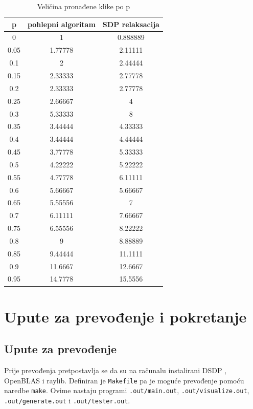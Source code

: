 \documentclass[diplomskirad]{fer}
\begin{document}
\begin{table}
  \caption{Veličina pronađene klike po p}
  \label{table:klik_p}
  \centering
  \begin{tabular}{|c|c|c|}
    \hline
    p & pohlepni algoritam & SDP relaksacija \\
    \hline
    \hline
    0 & 1 & 0.888889 \\
    \hline
    0.05 & 1.77778 & 2.11111 \\
    \hline
    0.1 & 2 & 2.44444 \\
    \hline
    0.15 & 2.33333 & 2.77778 \\
    \hline
    0.2 & 2.33333 & 2.77778 \\
    \hline
    0.25 & 2.66667 & 4 \\
    \hline
    0.3 & 5.33333 & 8 \\
    \hline
    0.35 & 3.44444 & 4.33333 \\
    \hline
    0.4 & 3.44444 & 4.44444 \\
    \hline
    0.45 & 3.77778 & 5.33333 \\
    \hline
    0.5 & 4.22222 & 5.22222 \\
    \hline
    0.55 & 4.77778 & 6.11111 \\
    \hline
    0.6 & 5.66667 & 5.66667 \\
    \hline
    0.65 & 5.55556 & 7 \\
    \hline
    0.7 & 6.11111 & 7.66667 \\
    \hline
    0.75 & 6.55556 & 8.22222 \\
    \hline
    0.8 & 9 & 8.88889 \\
    \hline
    0.85 & 9.44444 & 11.1111 \\
    \hline
    0.9 & 11.6667 & 12.6667 \\
    \hline
    0.95 & 14.7778 & 15.5556 \\
    \hline
  \end{tabular}
\end{table}

\chapter{Upute za prevođenje i pokretanje}
\label{pog:upute_za_prevođenje_i_pokretanje}
\section{Upute za prevođenje}
Prije prevođenja pretpostavlja se da su na računalu instalirani DSDP \cite{dsdp-user-guide}, OpenBLAS \cite{openBLAS} i raylib.
Definiran je \verb|Makefile| pa je moguće prevođenje pomoću naredbe \verb|make|. Ovime nastaju programi \verb|.out/main.out|, \verb|.out/visualize.out|, \verb|.out/generate.out| i 
\verb|.out/tester.out|.
\end{document}
